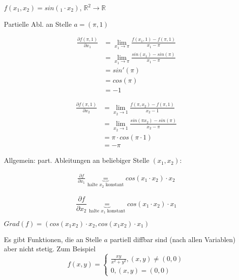 \documentclass[a4paper, openany]{book}
\begin{document}
          $f(x_1, x_2) = sin(_1 \cdot x_2)$, $\mathbb{R}^2 \rightarrow \mathbb{R}$

          \par \medskip

          Partielle Abl. an Stelle $a = (\pi, 1)$

          \begin{align*}
            \frac{ \partial f(\pi, 1)}{\partial x_1} & = \lim_{x_1 \rightarrow \pi} \frac{f(x_1, 1) - f(\pi, 1)}{x_1- \pi} \\
            & = \lim_{x_1 \rightarrow \pi} \frac{sin(x_1) - sin(\pi)}{x_1 - \pi} \\
            & = sin'(\pi) \\
            & = cos(\pi) \\
            & = -1
          \end{align*}

          \begin{align*}
            \frac{\partial f(\pi, 1)}{\partial x_2} & = \lim_{x_2 \rightarrow 1} \frac{f(\pi, x_2) - f(\pi, 1)}{x_2-1} \\
            & = \lim_{x_2 \rightarrow 1} \frac{sin(\pi x_2) - sin(\pi)}{x_2-\pi} \\
            & = \pi \cdot cos(\pi \cdot 1) \\
            & = - \pi
          \end{align*}

          Allgemein: part. Ableitungen an beliebiger Stelle $(x_1, x_2)$:

          \begin{align*}
            \frac{\partial f}{\partial x_1} \underbrace{=}_{\text{halte $x_2$ konstant}} cos(x_1 \cdot x_2) \cdot x_2
          \end{align*}

          \[ \frac{\partial f}{\partial x_2} \underbrace{=}_{\text{halte $x_1$ konstant}} cos(x_1 \cdot x_2) \cdot x_1 \]

          \par \medskip
          
          $Grad(f) = (cos(x_1x_2) \cdot x_2, cos(x_1x_2) \cdot x_1)$


          \par \medskip

          Es gibt Funktionen, die an Stelle $a$ partiell diffbar sind (nach allen Variablen) aber nicht stetig. Zum Beispiel \[ f(x,y) = \begin{cases} \frac{xy}{x^2+y^2}, (x,y) \neq (0,0) \\ 0, (x,y) = (0,0) \end{cases} \]
\end{document}

